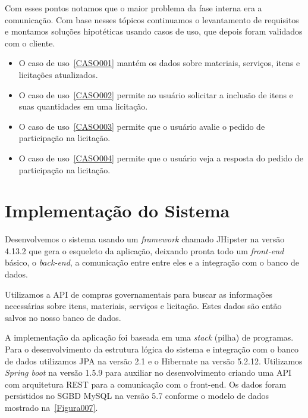 Com esses pontos notamos que o maior problema da fase interna era a comunicação. 
Com base nesses tópicos continuamos o levantamento de requisitos e montamos soluções hipotéticas usando casos de uso, que depois foram validados com o cliente.

\begin{itemize}
    \item O caso de uso~\ref{CASO001} mantém os dados sobre  materiais, serviços, itens e licitações atualizados.
    
    \item O caso de uso~\ref{CASO002} permite ao usuário solicitar a inclusão de itens e suas quantidades em uma licitação.

    \item O caso de uso~\ref{CASO003} permite que o usuário avalie o pedido de participação na licitação.
    
    \item O caso de uso~\ref{CASO004} permite que o usuário veja a resposta do pedido de participação na licitação.

\end{itemize}


\section{Implementação do Sistema}

Desenvolvemos o sistema usando um \textit{framework} chamado JHipster na versão 4.13.2 que gera o esqueleto da aplicação, deixando pronta todo um \textit{front-end} básico, o \textit{back-end}, a comunicação entre entre eles e a integração com o banco de dados.


Utilizamos a API de compras governamentais para buscar as informações necessárias sobre itens, materiais, serviços e licitação.
Estes dados são então salvos no nosso banco de dados.

A implementação da aplicação foi baseada em uma \textit{stack} (pilha) de programas.
Para o desenvolvimento da estrutura lógica do sistema e integração com o banco de dados utilizamos JPA na versão 2.1 e o Hibernate na versão 5.2.12. Utilizamos \textit{Spring boot} na versão 1.5.9 para auxiliar no desenvolvimento criando uma API com arquitetura REST para a comunicação com o front-end.
Os dados foram persistidos no SGBD MySQL na versão 5.7 conforme o modelo de dados mostrado na~\ref{Figura007}.

